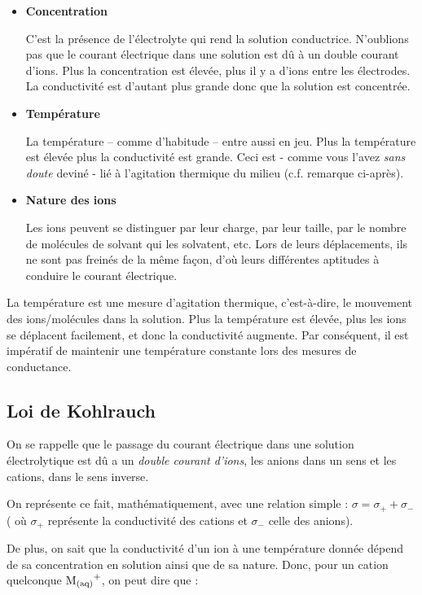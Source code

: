 \documentclass[11pt,a4paper]{article}
\begin{document}
\begin{itemize}
    \item \textbf{Concentration}
    
    C’est la présence de l’électrolyte qui rend la solution conductrice.  N’oublions pas que le courant électrique dans une solution est dû à un double courant d’ions.  Plus la concentration est élevée, plus il y a d’ions entre les électrodes. La conductivité est d’autant plus grande donc que la solution est concentrée.  
    \item \textbf{Température}
    
    La température – comme d’habitude – entre aussi en jeu.  Plus la température est  élevée plus la conductivité est grande. Ceci est - comme vous l'avez \textit{sans doute} deviné - lié à l'agitation thermique du milieu (c.f. remarque ci-après). 
    
    \item \textbf{Nature des ions}
    
    Les ions peuvent se distinguer par leur charge, par leur taille, par le nombre de molécules de solvant qui les solvatent, etc.  Lors de leurs déplacements, ils ne sont pas freinés de la même façon, d’où leurs différentes aptitudes à conduire le courant électrique. 
\end{itemize}
\begin{rmrq}
La température est une mesure d’agitation thermique, c'est-à-dire, le mouvement des ions/molécules dans la solution.  Plus la température est élevée, plus les ions se déplacent facilement, et donc la conductivité augmente.  Par conséquent, il est impératif de maintenir une température constante lors des mesures de conductance. 
\end{rmrq}

\subsection{Loi de Kohlrauch}
On se rappelle que le passage du courant électrique dans une solution électrolytique est dû a un \textit{double courant d’ions}, les anions dans un sens et les cations, dans le sens inverse.  

On représente ce fait, mathématiquement, avec une relation simple : $\sigma= \sigma_+ + \sigma_-$ ( où $\sigma_+$  représente la conductivité des cations et $\sigma_-$ celle des anions). 

De plus, on sait que la conductivité d’un ion à une température donnée dépend de sa concentration en solution ainsi que de sa nature.  Donc, pour un cation quelconque $\ce{M_{(aq)}^+}$, on peut dire que :
\end{document}
